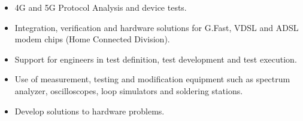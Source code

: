 \documentclass[10pt,a4paper,ragged2e]{altacv}
\begin{document}
\tagline{}

\begin{fullwidth}
\makecvheader
\end{fullwidth}



\begin{itemize}
\item 4G and 5G Protocol Analysis and device tests.
\end{itemize}

\divider

\begin{itemize}
\item Integration, verification and hardware solutions for G.Fast, VDSL and ADSL modem chips (Home Connected Division).
\item Support for engineers in test definition, test development and test execution.
\item Use of measurement, testing and modification equipment such as spectrum analyzer, oscilloscopes, loop simulators and soldering stations.
\item Develop solutions to hardware problems.
\end{itemize}
\end{document}
